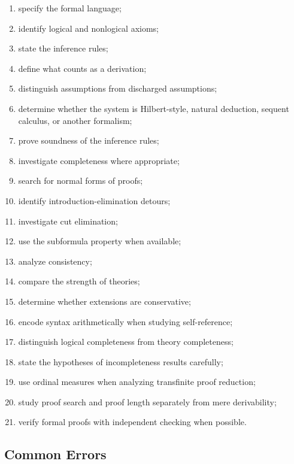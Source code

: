\begin{enumerate}
    \item specify the formal language;
    \item identify logical and nonlogical axioms;
    \item state the inference rules;
    \item define what counts as a derivation;
    \item distinguish assumptions from discharged assumptions;
    \item determine whether the system is Hilbert-style, natural
          deduction, sequent calculus, or another formalism;
    \item prove soundness of the inference rules;
    \item investigate completeness where appropriate;
    \item search for normal forms of proofs;
    \item identify introduction-elimination detours;
    \item investigate cut elimination;
    \item use the subformula property when available;
    \item analyze consistency;
    \item compare the strength of theories;
    \item determine whether extensions are conservative;
    \item encode syntax arithmetically when studying self-reference;
    \item distinguish logical completeness from theory completeness;
    \item state the hypotheses of incompleteness results carefully;
    \item use ordinal measures when analyzing transfinite proof reduction;
    \item study proof search and proof length separately from mere
          derivability;
    \item verify formal proofs with independent checking when possible.
\end{enumerate}

\subsection{Common Errors}
\label{subsec:proof-theory-common-errors}

